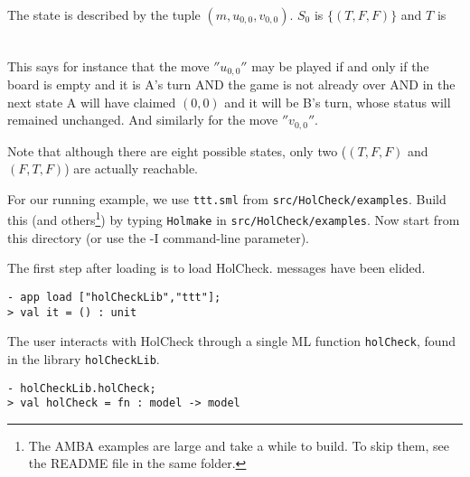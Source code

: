 \documentclass[12pt,fleqn]{article}
\newcommand{\hc}{HolCheck}
\begin{document}
The state is described by the tuple \( (m,u_{0,0},v_{0,0}) \). \(S_0\) is \( \{ (T,F,F) \} \) and \( T \) is

\begin{eqnarray*}
 [&(&''{u_{0,0}}'',(\lnot u_{0,0} \land \lnot v_{0,0} \land m) \land \lnot((\lnot m \land u_{0,0}) \lor (m \land v_{0,0}))\\
       &&\land (u_{0,0}' \land \lnot m' \land (v_{0,0}' = v_{0,0}))),\\
     &(&''{v_{0,0}}'',(\lnot v_{0,0} \land \lnot u_{0,0} \land \lnot m) \land \lnot((\lnot m \land u_{0,0}) \lor (m \land v_{0,0}))\\
        &&\land (v_{0,0}' \land m' \land (u_{0,0}' = u_{0,0})))]
\end{eqnarray*}

This says for instance that the move \(''{u_{0,0}}''\) may be played if and only if the board is empty and it is A's turn AND the game is not already over AND in the next state A will have claimed \((0,0)\) and it will be B's turn, whose status will remained unchanged. And similarly for the move \(''{v_{0,0}}''\).

Note that although there are eight possible states, only two (\((T,F,F)\) and \((F,T,F) \)) are actually reachable.

For our running example, we use \texttt{ttt.sml} from \texttt{src/HolCheck/examples}. Build this (and others\footnote{The AMBA examples are large and take a while to build. To skip them, see the README file in the same folder.}) by typing \texttt{Holmake} in \texttt{src/HolCheck/examples}. Now start \HOL{} from this directory (or use the -I command-line parameter).

The first step after loading \HOL{} is to load \hc{}. \HOL{} messages have been elided.

\setcounter{sessioncount}{0}

\begin{session}\begin{verbatim}
- app load ["holCheckLib","ttt"];
> val it = () : unit
\end{verbatim}\end{session}

The user interacts with \hc{} through a single ML function \texttt{holCheck}, found in the library \texttt{holCheckLib}.

\begin{session}\begin{verbatim}
- holCheckLib.holCheck;
> val holCheck = fn : model -> model
\end{verbatim}\end{session}
\end{document}

